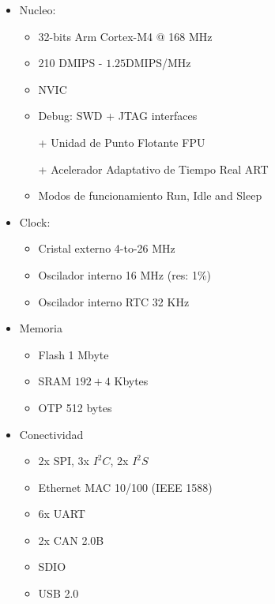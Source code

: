\documentclass[10pt, a4paper]{report}
\begin{document}
\begin{itemize}                                                                  
    \item Nucleo: 

        \begin{itemize}                                                                  
            \item  32-bits Arm Cortex-M4 @ 168 MHz     
            \item  210 \acrshort{DMIPS} - $1.25$\acrshort{DMIPS}/MHz
            \item \acrfull{NVIC}
            \item Debug: \acrfull{SWD} + JTAG interfaces
            \item [+] Unidad de Punto Flotante \acrshort{FPU} 
            \item [+] Acelerador Adaptativo de Tiempo Real \acrshort{ART} 
            \item Modos de funcionamiento Run, Idle and Sleep                          
        \end{itemize}

    \item Clock:

        \begin{itemize}
            \item Cristal externo 4-to-26 MHz 
            \item Oscilador interno 16 MHz (res: 1\%)
            \item Oscilador interno RTC 32 KHz 
        \end{itemize}

    \item Memoria                                       

        \begin{itemize}                                                                  
            \item Flash 1 Mbyte 
            \item \acrshort{SRAM} $192+4$ Kbytes  
            \item \acrshort{OTP} 512 bytes 
        \end{itemize}

    \item Conectividad

        \begin{itemize}                                                                  
            \item 2x SPI, 3x $I^2C$, 2x $I^2S$
            \item Ethernet MAC 10/100 (IEEE 1588)
            \item 6x UART 
            \item 2x CAN 2.0B 
            \item SDIO 
            \item USB 2.0 
        \end{itemize}


\end{itemize}
\end{document}
